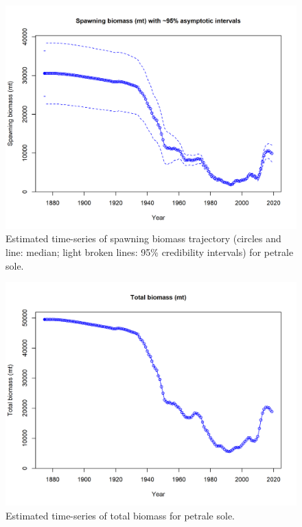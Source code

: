 \documentclass[12pt,]{article}
\begin{document}
\FloatBarrier

\begin{figure}
\centering
\includegraphics{r4ss/plots_mod1/ts7_Spawning_biomass_(mt)_with_95_asymptotic_intervals_intervals}
\caption{Estimated time-series of spawning biomass trajectory (circles
and line: median; light broken lines: 95\% credibility intervals) for
petrale sole. \label{fig:ssb}}
\end{figure}

\FloatBarrier

\begin{figure}
\centering
\includegraphics{r4ss/plots_mod1/ts1_Total_biomass_(mt).png}
\caption{Estimated time-series of total biomass for petrale sole.
\label{fig:total_bio}}
\end{figure}
\end{document}
